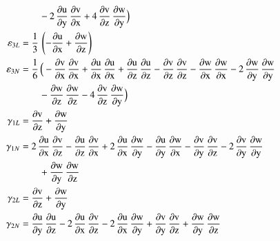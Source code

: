 \begin{subequations}
\begin{align}
	\mbox{} & \qquad - 2 \, \mathrm{\frac{\partial u}{\partial y}}\, \mathrm{\frac{\partial v}{\partial x}} + 4 \, \mathrm{\frac{\partial v}{\partial z}}\, \mathrm{\frac{\partial w}{\partial y}}\Big)\\
	\mathrm \varepsilon_{3L} & = \frac{1}{3} \, \left(-\mathrm{\frac{\partial u}{\partial x}} + \mathrm{\frac{\partial w}{\partial z}}\right)\\
	\mathrm \varepsilon_{3N} & = \frac{1}{6} \, \Big(- \mathrm{\frac{\partial v}{\partial x}}\, \mathrm{\frac{\partial v}{\partial x}} + \mathrm{\frac{ \partial u}{\partial x}}\, \mathrm{\frac{ \partial u}{\partial x}} + \mathrm{\frac{\partial u}{\partial z}}\, \mathrm{\frac{\partial u}{\partial z}} - \mathrm{\frac{\partial v}{\partial z}}\, \mathrm{\frac{\partial v}{\partial z}} - \mathrm{\frac{\partial w}{\partial x}}\, \mathrm{\frac{\partial w}{\partial x}} - 2 \,  \mathrm{\frac{\partial w}{\partial y}}\, \mathrm{\frac{\partial w}{\partial y}} \notag \\
	\mbox{} & \qquad - \mathrm{\frac{\partial w}{\partial z}}\, \mathrm{\frac{\partial w}{\partial z}} - 4 \, \mathrm{\frac{\partial v}{\partial z}}\, \mathrm{\frac{\partial w}{\partial y}}\Big)\\
	\mathrm \gamma_{1L} & = \mathrm{\frac{\partial v}{\partial z}} + \mathrm{\frac{\partial w}{\partial y}}\\
	\mathrm \gamma_{1N} & = 2 \, \mathrm{\frac{\partial u}{\partial x}}\, \mathrm{\frac{\partial v}{\partial z}} - \mathrm{\frac{ \partial u}{\partial z}}\, \mathrm{\frac{ \partial v}{\partial x}} + 2 \, \mathrm{\frac{\partial u}{\partial x}}\, \mathrm{\frac{\partial w}{\partial y}} - \mathrm{\frac{\partial u}{\partial y}}\, \mathrm{\frac{\partial w}{\partial x}} - \mathrm{\frac{\partial v}{\partial y}}\, \mathrm{\frac{\partial v}{\partial z}}  - 2 \, \mathrm{\frac{\partial v}{\partial y}}\, \mathrm{\frac{\partial w}{\partial y}} \notag \\
	\mbox{} & \qquad + \mathrm{\frac{\partial w}{\partial y}}\, \mathrm{\frac{\partial w}{\partial z}}\\
	\mathrm \gamma_{2L} & = \mathrm{\frac{\partial v}{\partial z}} + \mathrm{\frac{\partial w}{\partial y}}\\
	\mathrm \gamma_{2N} & = \mathrm{\frac{\partial u}{\partial y}}\, \mathrm{\frac{\partial u}{\partial z}} - 2 \, \mathrm{\frac{ \partial u}{\partial x}}\, \mathrm{\frac{ \partial v}{\partial z}} - 2 \, \mathrm{\frac{\partial u}{\partial x}}\, \mathrm{\frac{\partial w}{\partial y}} + \mathrm{\frac{\partial v}{\partial y}}\, \mathrm{\frac{\partial v}{\partial z}} + \mathrm{\frac{\partial w}{\partial y}}\, \mathrm{\frac{\partial w}{\partial z}}\\

\end{align}
\end{subequations}
